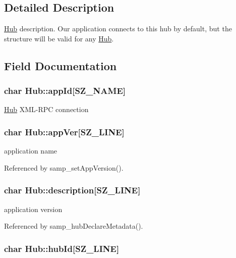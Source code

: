 \subsection{Detailed Description}
\hyperlink{structHub}{Hub} description. Our application connects to this hub by default, but the structure will be valid for any \hyperlink{structHub}{Hub}. 

\subsection{Field Documentation}
\hypertarget{structHub_8a3f77e49a9c33a20d272958b4c65c60}{
\subsubsection[{appId}]{\setlength{\rightskip}{0pt plus 5cm}char {\bf Hub::appId}\mbox{[}SZ\_\-NAME\mbox{]}}}
\label{structHub_8a3f77e49a9c33a20d272958b4c65c60}


\hyperlink{structHub}{Hub} XML-RPC connection \hypertarget{structHub_8d174b2376fff67044694077b5f44a0c}{
\subsubsection[{appVer}]{\setlength{\rightskip}{0pt plus 5cm}char {\bf Hub::appVer}\mbox{[}SZ\_\-LINE\mbox{]}}}
\label{structHub_8d174b2376fff67044694077b5f44a0c}


application name 

Referenced by samp\_\-setAppVersion().\hypertarget{structHub_0c01a576aab3a38c7003635c21ffb6f6}{
\subsubsection[{description}]{\setlength{\rightskip}{0pt plus 5cm}char {\bf Hub::description}\mbox{[}SZ\_\-LINE\mbox{]}}}
\label{structHub_0c01a576aab3a38c7003635c21ffb6f6}


application version 

Referenced by samp\_\-hubDeclareMetadata().\hypertarget{structHub_757e35902156611284f4190e6025639c}{
\subsubsection[{hubId}]{\setlength{\rightskip}{0pt plus 5cm}char {\bf Hub::hubId}\mbox{[}SZ\_\-LINE\mbox{]}}}
\label{structHub_757e35902156611284f4190e6025639c}


